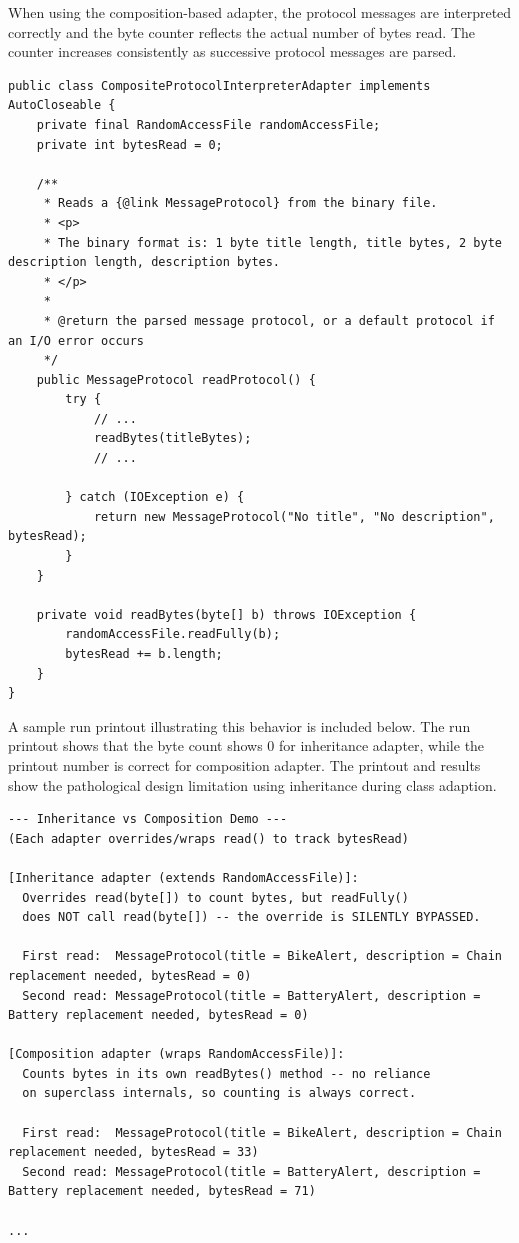 \documentclass[a4paper]{scrartcl}
\begin{document}
When using the composition-based adapter, the protocol messages are interpreted correctly and the byte counter reflects the actual number of bytes read. The counter increases consistently as successive protocol messages are parsed.

\begin{lstlisting}[style=javastyle, caption={Implementation of CompositeProtocolInterpreterAdapter}]
public class CompositeProtocolInterpreterAdapter implements AutoCloseable {
    private final RandomAccessFile randomAccessFile;
    private int bytesRead = 0;

    /**
     * Reads a {@link MessageProtocol} from the binary file.
     * <p>
     * The binary format is: 1 byte title length, title bytes, 2 byte description length, description bytes.
     * </p>
     *
     * @return the parsed message protocol, or a default protocol if an I/O error occurs
     */
    public MessageProtocol readProtocol() {
        try {
            // ...
            readBytes(titleBytes);
            // ...

        } catch (IOException e) {
            return new MessageProtocol("No title", "No description", bytesRead);
        }
    }

    private void readBytes(byte[] b) throws IOException {
        randomAccessFile.readFully(b);
        bytesRead += b.length;
    }
}
\end{lstlisting}

A sample run printout illustrating this behavior is included below. The run printout shows that the byte count shows 0 for inheritance adapter, while the printout number is correct for composition adapter. The printout and results show the pathological design limitation using inheritance during class adaption.

\begin{lstlisting}[style=outputstyle, caption={Sample output for comparing inheritance and composition}]
--- Inheritance vs Composition Demo ---
(Each adapter overrides/wraps read() to track bytesRead)

[Inheritance adapter (extends RandomAccessFile)]:
  Overrides read(byte[]) to count bytes, but readFully()
  does NOT call read(byte[]) -- the override is SILENTLY BYPASSED.

  First read:  MessageProtocol(title = BikeAlert, description = Chain replacement needed, bytesRead = 0)
  Second read: MessageProtocol(title = BatteryAlert, description = Battery replacement needed, bytesRead = 0)

[Composition adapter (wraps RandomAccessFile)]:
  Counts bytes in its own readBytes() method -- no reliance
  on superclass internals, so counting is always correct.

  First read:  MessageProtocol(title = BikeAlert, description = Chain replacement needed, bytesRead = 33)
  Second read: MessageProtocol(title = BatteryAlert, description = Battery replacement needed, bytesRead = 71)

...
\end{lstlisting}
\end{document}
